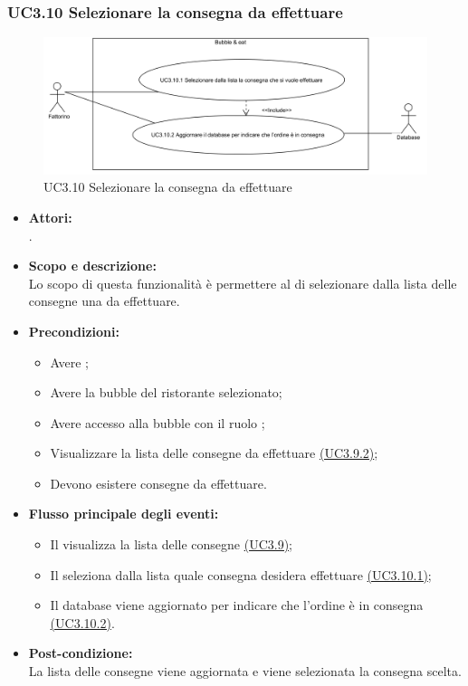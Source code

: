 \subsubsection{UC3.10 Selezionare la consegna da effettuare} \label{UC3.10}

\begin{figure}[H]
	\centering
	\includegraphics[width=15cm]{../../documenti/AnalisiDeiRequisiti/Diagrammi_img/uc3_10.png}
	\caption{UC3.10 Selezionare la consegna da effettuare}
\end{figure}

\begin{itemize}
	\item \textbf{Attori:}
	\\.
	\item \textbf{Scopo e descrizione:} 
	\\Lo scopo di questa funzionalità è permettere al  di selezionare dalla lista delle consegne una da effettuare.
	\item \textbf{Precondizioni:}
	\begin{itemize}
		\item Avere ;
		\item Avere la bubble del ristorante selezionato;
		\item Avere accesso alla bubble con il ruolo ;
		\item Visualizzare la lista delle consegne da effettuare \hyperref[UC3.9.2]{(UC3.9.2)};
		\item Devono esistere consegne da effettuare.
	\end{itemize}
	\item \textbf{Flusso principale degli eventi:}
	\begin{itemize}
		\item Il  visualizza la lista delle consegne \hyperref[UC3.9]{(UC3.9)};
		\item Il  seleziona dalla lista quale consegna desidera effettuare \hyperref[UC3.10.1]{(UC3.10.1)};
		\item Il database viene aggiornato per indicare che l’ordine è in consegna \hyperref[UC3.10.2]{(UC3.10.2)}.
	\end{itemize}
	\item \textbf{Post-condizione:}
	\\La lista delle consegne viene aggiornata e viene selezionata la consegna scelta.
\end{itemize}

